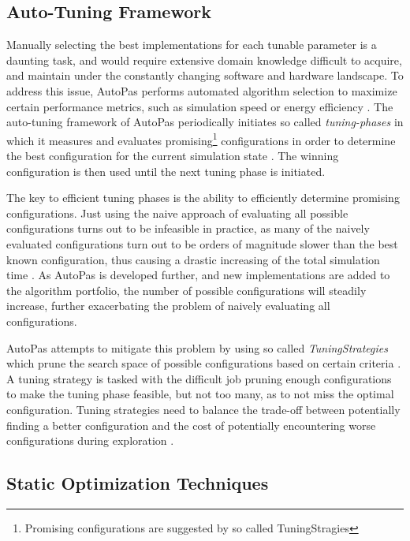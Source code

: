 \documentclass[conference]{IEEEtran}
\begin{document}
\subsection{Auto-Tuning Framework}

Manually selecting the best implementations for each tunable parameter is a daunting task, and would require extensive domain knowledge difficult to acquire, and maintain under the constantly changing software and hardware landscape. To address this issue, AutoPas performs automated algorithm selection to maximize certain performance metrics, such as simulation speed or energy efficiency \cite{Gratl2022AutoPas}. The auto-tuning framework of AutoPas periodically initiates so called \textit{tuning-phases} in which it measures and evaluates promising\footnote{Promising configurations are suggested by so called TuningStragies} configurations in order to determine the best configuration for the current simulation state \cite{Gratl2019AutoPas}. The winning configuration is then used until the next tuning phase is initiated.

The key to efficient tuning phases is the ability to efficiently determine promising configurations. Just using the naive approach of evaluating all possible configurations turns out to be infeasible in practice, as many of the naively evaluated configurations turn out to be orders of magnitude slower than the best known configuration, thus causing a drastic increasing of the total simulation time \cite{endreport.pdf}\cite{Manuel_Lerchner_Thesis.pdf}.
As AutoPas is developed further, and new implementations are added to the algorithm portfolio, the number of possible configurations will steadily increase, further exacerbating the problem of naively evaluating all configurations.

AutoPas attempts to mitigate this problem by using so called \textit{TuningStrategies} which prune the search space of possible configurations based on certain criteria \cite{Gratl2019AutoPas}. A tuning strategy is tasked with the difficult job pruning enough configurations to make the tuning phase feasible, but not too many, as to not miss the optimal configuration. Tuning strategies need to balance the trade-off between potentially finding a better configuration and the cost of potentially encountering worse configurations during exploration \cite{Newcome2023Poster}.



\subsection{Static Optimization Techniques}
\end{document}
